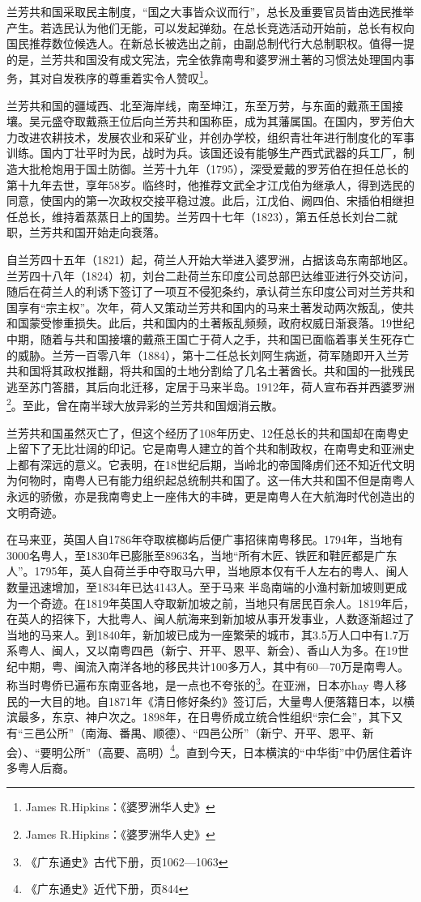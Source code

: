 兰芳共和国采取民主制度，“国之大事皆众议而行”，总长及重要官员皆由选民推举产生。若选民认为他们无能，可以发起弹劾。在总长竞选活动开始前，总长有权向国民推荐数位候选人。在新总长被选出之前，由副总制代行大总制职权。值得一提的是，兰芳共和国没有成文宪法，完全依靠南粤和婆罗洲土著的习惯法处理国内事务，其对自发秩序的尊重着实令人赞叹\footnote{James R.Hipkins：《婆罗洲华人史》}。

兰芳共和国的疆域西、北至海岸线，南至坤江，东至万劳，与东面的戴燕王国接壤。吴元盛夺取戴燕王位后向兰芳共和国称臣，成为其藩属国。在国内，罗芳伯大力改进农耕技术，发展农业和采矿业，并创办学校，组织青壮年进行制度化的军事训练。国内丁壮平时为民，战时为兵。该国还设有能够生产西式武器的兵工厂，制造大批枪炮用于国土防御。兰芳十九年（1795），深受爱戴的罗芳伯在担任总长的第十九年去世，享年58岁。临终时，他推荐文武全才江戊伯为继承人，得到选民的同意，使国内的第一次政权交接平稳过渡。此后，江戊伯、阙四伯、宋插伯相继担任总长，维持着蒸蒸日上的国势。兰芳四十七年（1823），第五任总长刘台二就职，兰芳共和国开始走向衰落。

自兰芳四十五年（1821）起，荷兰人开始大举进入婆罗洲，占据该岛东南部地区。兰芳四十八年（1824）初，刘台二赴荷兰东印度公司总部巴达维亚进行外交访问，随后在荷兰人的利诱下签订了一项互不侵犯条约，承认荷兰东印度公司对兰芳共和国享有“宗主权”。次年，荷人又策动兰芳共和国内的马来土著发动两次叛乱，使共和国蒙受惨重损失。此后，共和国内的土著叛乱频频，政府权威日渐衰落。19世纪中期，随着与共和国接壤的戴燕王国亡于荷人之手，共和国已面临着事关生死存亡的威胁。兰芳一百零八年（1884），第十二任总长刘阿生病逝，荷军随即开入兰芳共和国将其政权推翻，将共和国的土地分割给了几名土著酋长。共和国的一批残民逃至苏门答腊，其后向北迁移，定居于马来半岛。1912年，荷人宣布吞并西婆罗洲\footnote{James R.Hipkins：《婆罗洲华人史》}。至此，曾在南半球大放异彩的兰芳共和国烟消云散。

兰芳共和国虽然灭亡了，但这个经历了108年历史、12任总长的共和国却在南粤史上留下了无比壮阔的印记。它是南粤人建立的首个共和制政权，在南粤史和亚洲史上都有深远的意义。它表明，在18世纪后期，当岭北的帝国降虏们还不知近代文明为何物时，南粤人已有能力组织起总统制共和国了。这一伟大共和国不但是南粤人永远的骄傲，亦是我南粤史上一座伟大的丰碑，更是南粤人在大航海时代创造出的文明奇迹。

在马来亚，英国人自1786年夺取槟榔屿后便广事招徕南粤移民。1794年，当地有3000名粤人，至1830年已膨胀至8963名，当地“所有木匠、铁匠和鞋匠都是广东人”。1795年，英人自荷兰手中夺取马六甲，当地原本仅有千人左右的粤人、闽人数量迅速增加，至1834年已达4143人。至于马来 半岛南端的小渔村新加坡则更成为一个奇迹。在1819年英国人夺取新加坡之前，当地只有居民百余人。1819年后，在英人的招徕下，大批粤人、闽人航海来到新加坡从事开发事业，人数逐渐超过了当地的马来人。到1840年，新加坡已成为一座繁荣的城市，其3.5万人口中有1.7万系粤人、闽人，又以南粤四邑（新宁、开平、恩平、新会）、香山人为多。在19世纪中期，粤、闽流入南洋各地的移民共计100多万人，其中有60—70万是南粤人。称当时粤侨已遍布东南亚各地，是一点也不夸张的\footnote{《广东通史》古代下册，页1062—1063}。在亚洲，日本亦hay 粤人移民的一大目的地。自1871年《清日修好条约》签订后，大量粤人便落籍日本，以横滨最多，东京、神户次之。1898年，在日粤侨成立统合性组织“宗仁会”，其下又有“三邑公所”（南海、番禺、顺德）、“四邑公所”（新宁、开平、恩平、新会）、“要明公所”（高要、高明）\footnote{《广东通史》近代下册，页844}。直到今天，日本横滨的“中华街”中仍居住着许多粤人后裔。

